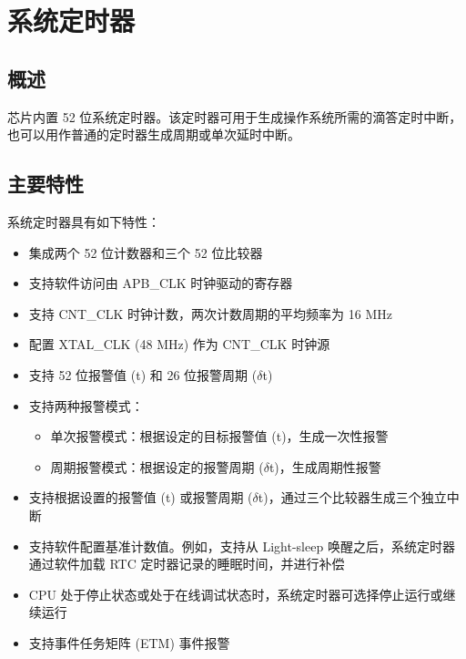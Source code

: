 \documentclass[main\_\_CN.tex]{subfiles}
\begin{document}

\ifglobal
\else
    \listoftodos
    {\let\clearpage\relax \listofdonetodos}
    \tableofcontents
\fi



\hypertarget{systimer}{}
\chapter{系统定时器}
\label{mod:systimer}

\section{概述}
\chipname{} 芯片内置 52 位系统定时器。该定时器可用于生成操作系统所需的滴答定时中断，也可以用作普通的定时器生成周期或单次延时中断。


\section{主要特性}

系统定时器具有如下特性：

\begin{itemize}
    \item 集成两个 52 位计数器和三个 52 位比较器
    \item 支持软件访问由 APB\_CLK 时钟驱动的寄存器
    \item 支持 CNT\_CLK 时钟计数，两次计数周期的平均频率为 16 MHz
    \item 配置 XTAL\_CLK (48 MHz) 作为 CNT\_CLK 时钟源
    \item 支持 52 位报警值 (t) 和 26 位报警周期 ($\delta$t)
    \item 支持两种报警模式：
    \begin{itemize}
        \item 单次报警模式：根据设定的目标报警值 (t)，生成一次性报警
        \item 周期报警模式：根据设定的报警周期 ($\delta$t)，生成周期性报警
    \end{itemize}
    \item 支持根据设置的报警值 (t) 或报警周期 ($\delta$t)，通过三个比较器生成三个独立中断
    \item 支持软件配置基准计数值。例如，支持从 Light-sleep 唤醒之后，系统定时器通过软件加载 RTC 定时器记录的睡眠时间，并进行补偿
    \item CPU 处于停止状态或处于在线调试状态时，系统定时器可选择停止运行或继续运行
    \item 支持事件任务矩阵 (ETM) 事件报警
\end{itemize}
\end{document}
